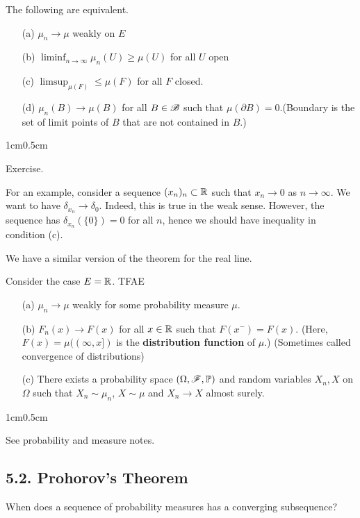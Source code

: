 \documentclass[12pt,a4paper]{report}
\newenvironment{proof}
{\begin{changemargin}{1cm}{0.5cm} 
	}%
	{\end{changemargin}
}
\begin{document}
 The following are equivalent.
\begin{itemize}
\item[(a)] $\mu_n \rightarrow \mu$ weakly on $E$
\item[(b)] $\liminf_{n\rightarrow \infty} \mu_n(U) \geq \mu(U)$ for all $U$ open
\item[(c)] $\limsup_{\mu(F)} \leq \mu(F)$ for all $F$ closed.
\item[(d)] $\mu_n(B) \rightarrow \mu(B)$ for all $B \in \mathscr{B}$ such that $\mu(\partial B)=0$.(Boundary is the set of limit points of $B$ that are not contained in $B$.)
\end{itemize}
\begin{proof}
\pf Exercise.
\end{proof}
\s

For an example, consider a sequence $(x_n)_n \subset \mathbb{R}$ such that $x_n \rightarrow 0$ as $n\rightarrow \infty$. We want to have $\delta_{x_n} \rightarrow \delta_0$. Indeed, this is true in the weak sense. However, the sequence has $\delta_{x_n}(\{0\}) =0$ for all $n$, hence we should have inequality in condition (c).
\s

We have a similar version of the theorem for the real line.
\s

 Consider the case $E =\mathbb{R}$. TFAE
\begin{itemize}
\item[(a)] $\mu_n \rightarrow \mu$ weakly for some probability measure $\mu$.
\item[(b)] $F_n(x) \rightarrow F(x)$ for all $x\in \mathbb{R}$ such that $F(x^-) = F(x)$. (Here, $F(x)  = \mu((\infty,x])$ is the \textbf{distribution function} of $\mu$.) (Sometimes called convergence of distributions)
\item[(c)] There exists a probability space $(\Omega,\mathscr{F}, \mathbb{P})$ and random variables $X_n, X$ on $\Omega$ such that $X_n \sim \mu_n$, $X\sim \mu$ and $X_n \rightarrow X$ almost surely.
\end{itemize}
\begin{proof}
\pf See probability and measure notes.
\end{proof}
\s

\subsection*{5.2. Prohorov's Theorem}

When does a sequence of probability measures has a converging subsequence?
\s
\end{document}

